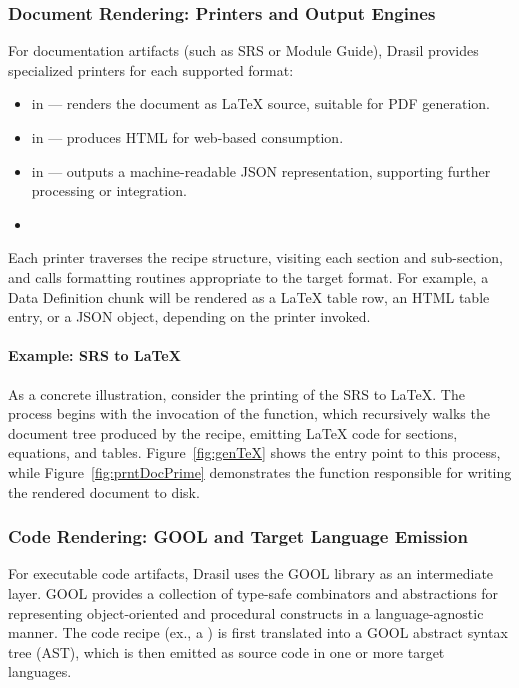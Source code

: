 \subsubsection{Document Rendering: Printers and Output Engines}
For documentation artifacts (such as SRS or Module Guide), Drasil provides 
specialized printers for each supported format:
\begin{itemize}
    \item {} in  --- renders the 
    document as \LaTeX{} source, suitable for PDF generation.
    \item {} in  --- produces 
    HTML for web-based consumption.
    \item {} in  --- outputs a 
    machine-readable JSON representation, supporting further processing or 
    integration.
	\item {}
\end{itemize}

Each printer traverses the recipe structure, visiting each section and 
sub-section, and calls formatting routines appropriate to the target format. 
For example, a Data Definition chunk will be rendered as a LaTeX table row, an 
HTML table entry, or a JSON object, depending on the printer invoked.
\paragraph{Example: SRS to \LaTeX{}}
As a concrete illustration, consider the printing of the \gb{} SRS to 
\LaTeX{}. The process begins with the invocation of the  
function, which recursively walks the document tree produced by the recipe, 
emitting \LaTeX{} code for sections, equations, and tables. 
Figure~\ref{fig:genTeX} shows the entry point to this process, while 
Figure~\ref{fig:prntDocPrime} demonstrates the function responsible for writing 
the rendered document to disk.



\subsubsection{Code Rendering: GOOL and Target Language Emission}
For executable code artifacts, Drasil uses the GOOL library as an intermediate 
layer. GOOL provides a collection of type-safe combinators and abstractions for 
representing object-oriented and procedural constructs in a language-agnostic 
manner. The code recipe (ex., a ) is first translated into a 
GOOL abstract syntax tree (AST), which is then emitted as source code in one or 
more target languages.
